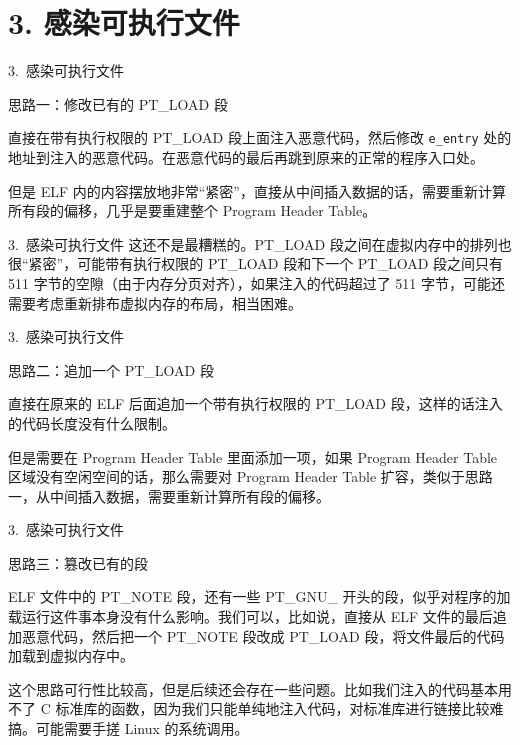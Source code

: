 \documentclass{beamer}
\begin{document}
\section{3. 感染可执行文件}

\begin{frame}{3.\ 感染可执行文件}
  \begin{block}{思路一：修改已有的 PT\_LOAD 段}

  直接在带有执行权限的 PT\_LOAD 段上面注入恶意代码，然后修改 \texttt{e\_entry} 处的地址到注入的恶意代码。在恶意代码的最后再跳到原来的正常的程序入口处。

  \pause\vspace{0.6em}

  但是 ELF 内的内容摆放地非常“紧密”，直接从中间插入数据的话，需要重新计算所有段的偏移，几乎是要重建整个 Program Header Table。

  \end{block}
\end{frame}

\begin{frame}{3.\ 感染可执行文件}
  这还不是最糟糕的。PT\_LOAD 段之间在虚拟内存中的排列也很“紧密”，可能带有执行权限的 PT\_LOAD 段和下一个 PT\_LOAD 段之间只有 511 字节的空隙（由于内存分页对齐），如果注入的代码超过了 511 字节，可能还需要考虑重新排布虚拟内存的布局，相当困难。
\end{frame}

\begin{frame}{3.\ 感染可执行文件}
  \begin{block}{思路二：追加一个 PT\_LOAD 段}

  直接在原来的 ELF 后面追加一个带有执行权限的 PT\_LOAD 段，这样的话注入的代码长度没有什么限制。

  \pause\vspace{0.6em}

  但是需要在 Program Header Table 里面添加一项，如果 Program Header Table 区域没有空闲空间的话，那么需要对 Program Header Table 扩容，类似于思路一，从中间插入数据，需要重新计算所有段的偏移。

  \end{block}
\end{frame}

\begin{frame}{3.\ 感染可执行文件}
  \begin{block}{思路三：篡改已有的段}

  ELF 文件中的 PT\_NOTE 段，还有一些 PT\_GNU\_ 开头的段，似乎对程序的加载运行这件事本身没有什么影响。我们可以，比如说，直接从 ELF 文件的最后追加恶意代码，然后把一个 PT\_NOTE 段改成 PT\_LOAD 段，将文件最后的代码加载到虚拟内存中。

  \pause\vspace{0.6em}

  这个思路可行性比较高，但是后续还会存在一些问题。比如我们注入的代码基本用不了 C 标准库的函数，因为我们只能单纯地注入代码，对标准库进行链接比较难搞。可能需要手搓 Linux 的系统调用。

  \end{block}
\end{frame}
\end{document}

